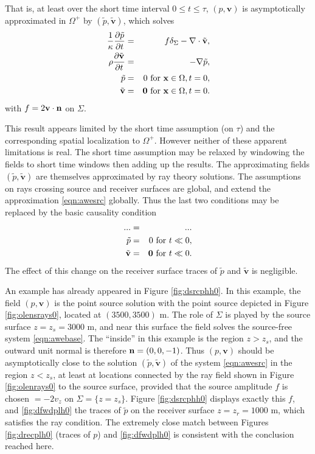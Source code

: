 \documentclass[georeport,12pt]{geophysics}
\newcommand{\bx}{\mathbf{x}}
\newcommand{\bv}{\mathbf{v}}
\begin{document}
That is, at least over the short time interval $0 \le t \le \tau$,
$(p,\bv)$ is asymptotically approximated in $\Omega^+$ by
$(\tilde{p},\tilde{\bv})$, which solves
\begin{eqnarray}
\label{eqn:awesrc}
  \frac{1}{\kappa}\frac{\partial\tilde{p}}{\partial t} & = & f \delta_{\Sigma}
                                                      - \nabla \cdot \tilde{\bv}, \nonumber \\
  \rho\frac{\partial \tilde{\bv}}{\partial t} & = & - \nabla \tilde{p},\\
  \tilde{p} & = & 0 \mbox{ for } \bx \in \Omega, t=0, \\
  \tilde{\bv} & = & {\bf 0} \mbox{ for } \bx \in \Omega, t = 0.       
\end{eqnarray}
with $f = 2 \bv \cdot {\bf n}$ on $\Sigma$.

This result appears limited by the short time assumption (on $\tau$)
and the corresponding spatial localization to $\Omega^+$. However
neither of these apparent limitations is real. The short time
assumption may be relaxed by windowing the fields to short time
windows then adding up the results. The approximating fields
$(\tilde{p}, \tilde{\bv})$ are themselves approximated by ray
theory solutions. The assumptions on rays crossing source and receiver
surfaces are global, and extend the approximation \ref{eqn:awesrc}
globally. Thus the last two conditions may be replaced by the basic
causality condition
\begin{eqnarray}
  \label{eqn:awesrcmod}
  ... & = & ...\\
  \tilde{p} & = & 0 \mbox{ for }  t \ll 0, \\
  \tilde{\bv} & = & {\bf 0} \mbox{ for } t \ll 0.       
\end{eqnarray}
The effect of this change on the receiver surface traces of $\tilde{p}$ and
$\tilde{\bv}$ is negligible.

An example has already appeared in Figure \ref{fig:dsrcphh0}. In this
example, the field $(p, \bv)$ is the point source solution with the
point source depicted in Figure \ref{fig:olensrays0}, located at
$(3500, 3500)$ m. The role of $\Sigma$ is played by the source surface
$z=z_s=3000$ m, and near this surface the field solves the source-free
system \ref{eqn:awebase}. The ``inside'' in this example is the region
$z > z_s$, and the outward unit normal is therefore ${\bf n}=(0,0,-1)$.
Thus $(p,\bv)$ should be asymptotically close to the solution
$(\tilde{p},\tilde{\bv})$ of the
system \ref{eqn:awesrc} in the region $z< z_s$, at least at locations
connected by the ray field shown in Figure \ref{fig:olenrays0} to the
source surface, provided that the source amplitude $f$ is chosen $=
-2v_z$ on $\Sigma=\{z=z_s\}$. Figure \ref{fig:dsrcphh0} displays exactly this $f$, and
\ref{fig:dfwdplh0} the traces of $\tilde{p}$ on the
  receiver surface $z=z_r=1000$ m, which satisfies the ray condition. The extremely
close match between Figures \ref{fig:drecplh0} (traces of $p$) and
\ref{fig:dfwdplh0} is consistent with the conclusion reached here.
\end{document}

